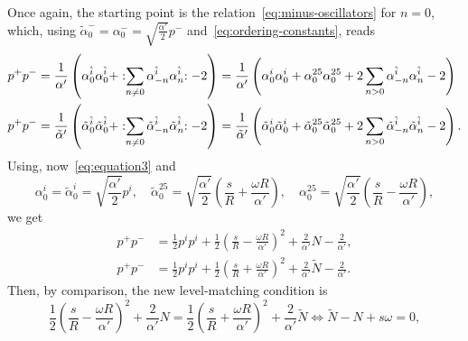 \begin{mdframed}
\begin{innerproof}
    Once again, the starting point is the relation~\eqref{eq:minus-oscillators} for $n=0$, which, using $\tilde{\alpha}^-_0 = \alpha^-_0 = \sqrt{\frac{\alpha'}{2}}p^-$ and~\eqref{eq:ordering-constants}, reads
    \begin{equation*}
    \begin{aligned}
        p^+p^- &= \frac{1}{\alpha'} \left( \alpha^{\hat{i}}_0 \alpha^{\hat{i}}_0 + :\mathrel{\sum_{n \neq 0}\alpha^{\hat{i}}_{-n}\alpha^{\hat{i}}_n}: - 2 \right) = \frac{1}{\alpha'} \left( \alpha^{{i}}_0 \alpha^{{i}}_0 + \alpha^{25}_0 \alpha^{25}_0 + 2 \sum_{n>  0} \alpha^{\hat{i}}_{-n}\alpha^{\hat{i}}_n - 2 \right) \\
        p^+p^- &= \frac{1}{\tilde{\alpha}'} \left( \tilde{\alpha}^{\hat{i}}_0 \tilde{\alpha}^{\hat{i}}_0 + :\mathrel{\sum_{n \neq 0}\tilde{\alpha}^{\hat{i}}_{-n}\tilde{\alpha}^{\hat{i}}_n}: - 2 \right) = \frac{1}{\tilde{\alpha}'} \left( \tilde{\alpha}^{{i}}_0 \tilde{\alpha}^{{i}}_0 + \tilde{\alpha}^{25}_0 \tilde{\alpha}^{25}_0 + 2 \sum_{n> 0} \tilde{\alpha}^{\hat{i}}_{-n}\tilde{\alpha}^{\hat{i}}_n - 2 \right) .
    \end{aligned}
    \end{equation*}
    Using, now~\eqref{eq:equation3} and
    \begin{equation*}
        \alpha^i_0 = \tilde{\alpha}^i_0 = \sqrt{\frac{\alpha'}{2}}p^i, \quad \tilde{\alpha}^{25}_0 = \sqrt{\frac{\alpha'}{2}} \left( \frac{s}{R} + \frac{\omega R}{\alpha'} \right), \quad {\alpha}^{25}_0 = \sqrt{\frac{\alpha'}{2}} \left( \frac{s}{R} - \frac{\omega R}{\alpha'} \right), 
    \end{equation*}
    we get
    \begin{equation*}
    \begin{aligned}
        p^+p^- &= \frac{1}{2} p^i p^i + \frac{1}{2} \left( \frac{s}{R} - \frac{\omega R}{\alpha'} \right)^2 + \frac{2}{\alpha'} N - \frac{2}{\alpha'} ,\\
        p^+p^- &= \frac{1}{2} p^i p^i + \frac{1}{2} \left( \frac{s}{R} + \frac{\omega R}{\alpha'} \right)^2 + \frac{2}{\alpha'} \tilde{N} - \frac{2}{\alpha'} .
    \end{aligned}
    \end{equation*}
    Then, by comparison, the new level-matching condition is
    \begin{equation*}
        \frac{1}{2} \left( \frac{s}{R} - \frac{\omega R}{\alpha'} \right)^2 + \frac{2}{\alpha'} N = \frac{1}{2} \left( \frac{s}{R} + \frac{\omega R}{\alpha'} \right)^2 + \frac{2}{\alpha'} \tilde{N} \iff \tilde{N} - N + s \omega  = 0,

\end{equation*}
\end{innerproof}
\end{mdframed}
